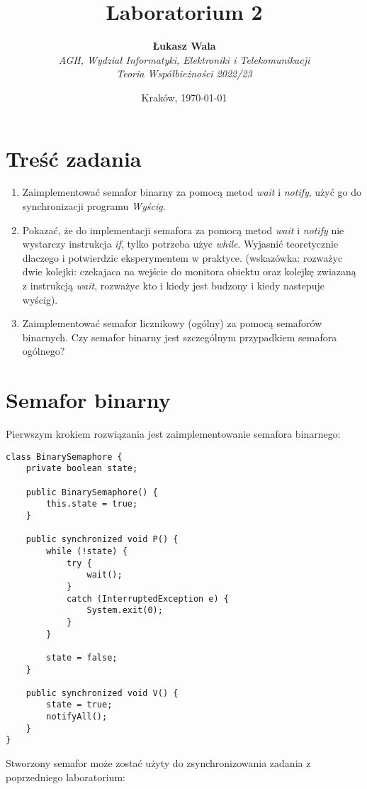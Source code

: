\documentclass{article}
\title{Laboratorium 2}
\author{\textbf{Łukasz Wala}\\
    \textit{AGH, Wydział Informatyki, Elektroniki i Telekomunikacji} \\
    \textit{Teoria Współbieżności 2022/23}}
\date{Kraków, \today}
\begin{document}
\maketitle

\section{Treść zadania}
\begin{enumerate}
    \item
    Zaimplementować semafor binarny za pomocą metod \textit{wait} i \textit{notify}, użyć go do synchronizacji programu \textit{Wyścig}.
    \item
    Pokazać, że do implementacji semafora za pomocą metod \textit{wait} i \textit{notify} nie wystarczy instrukcja \textit{if}, tylko potrzeba użyc \textit{while}. 
    Wyjasnić teoretycznie dlaczego i potwierdzic eksperymentem w praktyce. (wskazówka: rozważyc dwie kolejki: 
    czekajaca na wejście do monitora obiektu oraz kolejkę zwiazaną z instrukcją \textit{wait}, rozważyc kto i kiedy jest budzony i kiedy nastepuje wyścig).
    \item
    Zaimplementować semafor licznikowy (ogólny) za pomocą semaforów binarnych. Czy semafor binarny jest szczególnym przypadkiem semafora ogólnego?
\end{enumerate}

\section{Semafor binarny}

Pierwszym krokiem rozwiązania jest zaimplementowanie semafora binarnego:

\begin{verbatim}
class BinarySemaphore {
    private boolean state;

    public BinarySemaphore() {
        this.state = true;
    }

    public synchronized void P() {
        while (!state) {
            try {
                wait();  
            }
            catch (InterruptedException e) {
                System.exit(0);
            }
        }

        state = false;
    }
    
    public synchronized void V() {
        state = true;
        notifyAll();
    }
}                
\end{verbatim}

Stworzony semafor może zostać użyty do zsynchronizowania zadania z poprzedniego laboratorium:
\end{document}
